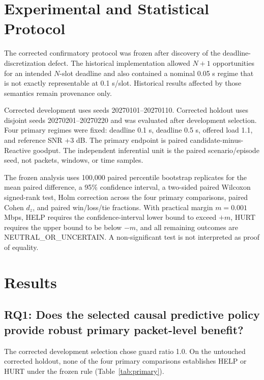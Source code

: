 \documentclass[conference]{IEEEtran}
\begin{document}
\section{Experimental and Statistical Protocol}
The corrected confirmatory protocol was frozen after discovery of the deadline-discretization defect. The historical implementation allowed $N+1$ opportunities for an intended $N$-slot deadline and also contained a nominal 0.05 s regime that is not exactly representable at 0.1 s/slot. Historical results affected by those semantics remain provenance only.

Corrected development uses seeds 20270101--20270110. Corrected holdout uses disjoint seeds 20270201--20270220 and was evaluated after development selection. Four primary regimes were fixed: deadline 0.1 s, deadline 0.5 s, offered load 1.1, and reference SNR +3 dB. The primary endpoint is paired candidate-minus-Reactive goodput. The independent inferential unit is the paired scenario/episode seed, not packets, windows, or time samples.

The frozen analysis uses 100,000 paired percentile bootstrap replicates for the mean paired difference, a 95\% confidence interval, a two-sided paired Wilcoxon signed-rank test, Holm correction across the four primary comparisons, paired Cohen $d_z$, and paired win/loss/tie fractions. With practical margin $m=0.001$ Mbps, HELP requires the confidence-interval lower bound to exceed $+m$, HURT requires the upper bound to be below $-m$, and all remaining outcomes are NEUTRAL\_OR\_UNCERTAIN. A non-significant test is not interpreted as proof of equality.

\section{Results}
\subsection{RQ1: Does the selected causal predictive policy provide robust primary packet-level benefit?}
The corrected development selection chose guard ratio 1.0. On the untouched corrected holdout, none of the four primary comparisons establishes HELP or HURT under the frozen rule (Table~\ref{tab:primary}).
\end{document}
